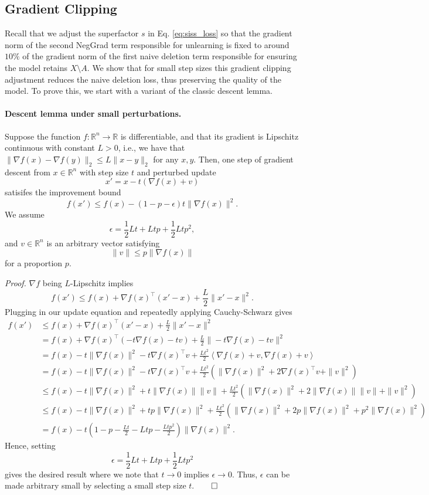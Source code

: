 \documentclass{article} \usepackage{iclr2025_conference,times}
\begin{document}
\subsection{Gradient Clipping}
\label{apndx:gradient_clipping}
Recall that we adjust the superfactor $s$ in Eq. \ref{eq:siss_loss} so that the gradient norm of the second NegGrad term responsible for unlearning is fixed to around $10\%$ of the gradient norm of the first naive deletion term responsible for ensuring the model retains $X\setminus A$. We show that for small step sizes this gradient clipping adjustment reduces the naive deletion loss, thus preserving the quality of the model. To prove this, we start with a variant of the classic descent lemma.

\paragraph{Descent lemma under small perturbations.} Suppose the function $f:\mathbb{R}^n \to \mathbb{R}$ is differentiable, and that its gradient is Lipschitz continuous with constant $L > 0$, i.e., we have that $\|\nabla f(x) - \nabla f(y)\|_2 \leq L \|x - y\|_2$ for any $x, y$. Then, one step of gradient descent from $x\in\mathbb{R}^n$ with step size $t$ and perturbed update 
$$x'=x-t(\nabla f(x)+v)$$
satisifes the improvement bound 
$$f(x')\le f(x) - (1-p-\epsilon)t\|\nabla f(x)\|^2.$$
We assume
$$\epsilon = \frac{1}{2}Lt+Ltp+\frac{1}{2}Ltp^2,$$
and $v\in\mathbb{R}^n$ is an arbitrary vector satisfying 
$$\|v\|\le p\|\nabla f(x)\|$$
for a proportion $p$.

\textit{Proof.} $\nabla f$ being $L$-Lipschitz implies
$$f(x')\le f(x)+\nabla f(x)^\top (x'-x)+\frac{L}{2}\|x'-x\|^2.$$
Plugging in our update equation and repeatedly applying Cauchy-Schwarz gives
\begin{align*}
    f(x')&\le f(x)+\nabla f(x)^\top (x'-x)+\frac{L}{2}\|x'-x\|^2\\
        &= f(x)+\nabla f(x)^\top (-t\nabla f(x)-tv)+\frac{L}{2}\|-t\nabla f(x)-tv\|^2\\
        &= f(x)-t\|\nabla f(x)\|^2-t\nabla f(x)^\top v+\frac{Lt^2}{2}\left\langle\nabla f(x)+v, \nabla f(x)+v\right\rangle\\
        &=f(x)-t\|\nabla f(x)\|^2-t\nabla f(x)^\top v+\frac{Lt^2}{2}\left(\|\nabla f(x)\|^2+2\nabla f(x)^\top v+\|v\|^2\right)\\
        &\le f(x)-t\|\nabla f(x)\|^2+t\|\nabla f(x)\| \|v\|+\frac{Lt^2}{2}\left(\|\nabla f(x)\|^2+2\|\nabla f(x)\| \|v\|+\|v\|^2\right)\\
        &\le f(x)-t\|\nabla f(x)\|^2+tp\|\nabla f(x)\|^2+\frac{Lt^2}{2}\left(\|\nabla f(x)\|^2+2p\|\nabla f(x)\|^2 +p^2\|\nabla f(x)\|^2\right)\\
        &=f(x)-t\left(1-p-\frac{Lt}{2}-Ltp-\frac{Ltp^2}{2}\right)\|\nabla f(x)\|^2.
\end{align*}
Hence, setting 
$$\epsilon = \frac{1}{2}Lt+Ltp+\frac{1}{2}Ltp^2$$
gives the desired result where we note that $t\to 0$ implies $\epsilon\to 0$. Thus, $\epsilon$ can be made arbitrary small by selecting a small step size $t$.$\qed$
\end{document}
